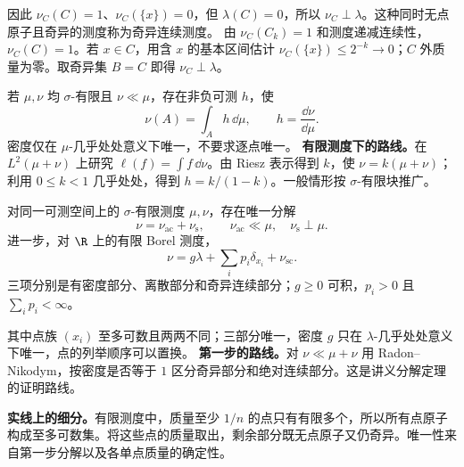 因此 $\nu_C(C)=1$、$\nu_C(\{x\})=0$，但 $\lambda(C)=0$，所以 $\nu_C\perp\lambda$。这种同时无点原子且奇异的测度称为奇异连续测度。
由 $\nu_C(C_k)=1$ 和测度递减连续性，$\nu_C(C)=1$。若 $x\in C$，用含 $x$ 的基本区间估计 $\nu_C(\{x\})\le2^{-k}\to0$；$C$ 外质量为零。取奇异集 $B=C$ 即得 $\nu_C\perp\lambda$。

若 $\mu,\nu$ 均 $\sigma$-有限且 $\nu\ll\mu$，存在非负可测 $h$，使
\[
\nu(A)=\int_Ah\,\dd\mu,\qquad
h=\frac{\dd\nu}{\dd\mu}.
\]
密度仅在 $\mu$-几乎处处意义下唯一，不要求逐点唯一。
\textbf{有限测度下的路线。}在 $L^2(\mu+\nu)$ 上研究 $\ell(f)=\int f\,\dd\nu$。由 Riesz 表示得到 $k$，使 $\nu=k(\mu+\nu)$；利用 $0\le k<1$ 几乎处处，得到 $h=k/(1-k)$。一般情形按 $\sigma$-有限块推广。

对同一可测空间上的 $\sigma$-有限测度 $\mu,\nu$，存在唯一分解
\[
\nu=\nu_{\mathrm{ac}}+\nu_{\mathrm{s}},
\qquad \nu_{\mathrm{ac}}\ll\mu,\quad\nu_{\mathrm{s}}\perp\mu.
\]
进一步，对 $\R$ 上的有限 Borel 测度，
\[
\nu=g\lambda+\sum_i p_i\delta_{x_i}+\nu_{\mathrm{sc}}.
\]
三项分别是有密度部分、离散部分和奇异连续部分；$g\ge0$ 可积，$p_i>0$ 且 $\sum_i p_i<\infty$。

其中点族 $(x_i)$ 至多可数且两两不同；三部分唯一，密度 $g$ 只在 $\lambda$-几乎处处意义下唯一，点的列举顺序可以置换。
\textbf{第一步的路线。}对 $\nu\ll\mu+\nu$ 用 Radon–Nikodym，按密度是否等于 $1$ 区分奇异部分和绝对连续部分。这是讲义分解定理的证明路线。

\textbf{实线上的细分。}有限测度中，质量至少 $1/n$ 的点只有有限多个，所以所有点原子构成至多可数集。将这些点的质量取出，剩余部分既无点原子又仍奇异。唯一性来自第一步分解以及各单点质量的确定性。
